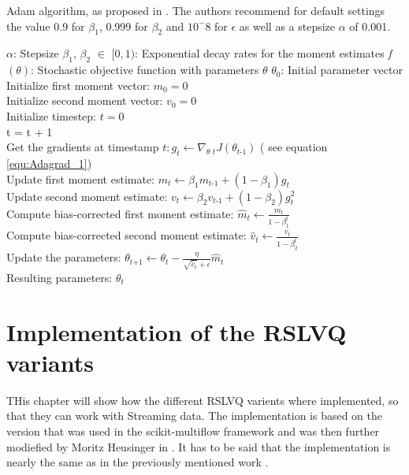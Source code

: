 \documentclass[12pt,oneside,a4paper,parskip]{scrbook}
\begin{document}
\begin{algorithm}
  \caption{Adam algorithm, as proposed in \cite{Kingma2014AdamAM}. The authors recommend for default settings the value
          0.9 for $\beta_1$, 0.999 for $\beta_2$ and $10^-8$ for $\epsilon$ as well as a stepsize $\alpha$ of 0.001.}\label{euclid}
  \begin{algorithmic}[1]
    \Require $\alpha$: Stepsize
    \Require $\beta_1$, $\beta_2$ $\in$ $[0,1)$: Exponential decay rates for the moment estimates
    \Require \textit{f}$(\theta)$: Stochastic objective function with parameters $\theta$
    \Require $\theta_0$: Initial parameter vector \\
    Initialize first moment vector: $m_0 = 0$ \\
    Initialize second moment vector: $v_0 = 0$ \\
    Initialize timestep: $t = 0$ 
     \\
      t = t + 1 \\
      Get the gradients at timestamp $\textit{t}: \textit{g}_t \leftarrow \nabla_\textit{$\theta$ t}\textit{J}(\theta_\textit{t-1})$ ( see equation \ref{equ:Adagrad_1}) \\
      Update first moment estimate: $\textit{m}_t \leftarrow \beta_1\textit{m}_\textit{t-1} + (1-\beta_1)\textit{g}_t$ \\
      Update second moment estimate: $\textit{v}_t \leftarrow \beta_2\textit{v}_\textit{t-1} + (1-\beta_2)\textit{g}^2_t$ \\
      Compute bias-corrected first moment estimate: $\hat{m}_t \leftarrow \frac{\textit{m}_t}{1-\beta^t_1}$ \\
      Compute bias-corrected second moment estimate: $\hat{v}_t \leftarrow \frac{\textit{v}_t}{1-\beta^t_2}$ \\
      Update the parameters: $\theta_\textit{t+1} \leftarrow \theta_\textit{t}-\frac{\eta}{\sqrt{\hat{v}_t}+ \epsilon} \hat{m}_t$ \\
    \EndWhile
    \Return Resulting parameters: $\theta_t$
  \end{algorithmic}
\end{algorithm}

\section{Implementation of the RSLVQ variants}
THis chapter will show how the different RSLVQ varients where implemented, so that they can work with Streaming data.
The implementation is based on the version that was used in the scikit-multiflow framework \cite{skmultiflow} and was then further 
modiefied by Moritz Heusinger in \cite{PassiveDriftonRSLVQ}.
It has to be said that the implementation is nearly the same as in the previously mentioned work \cite{PassiveDriftonRSLVQ}.
\end{document}
